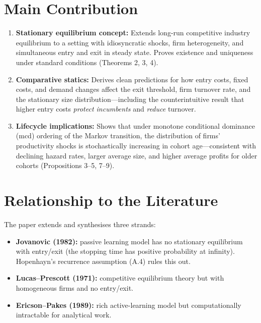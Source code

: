 \section{Main Contribution}

\begin{enumerate}
  \item \textbf{Stationary equilibrium concept:} Extends long-run competitive
    industry equilibrium to a setting with idiosyncratic shocks, firm
    heterogeneity, and simultaneous entry and exit in steady state. Proves
    existence and uniqueness under standard conditions (Theorems 2, 3, 4).

  \item \textbf{Comparative statics:} Derives clean predictions for how entry
    costs, fixed costs, and demand changes affect the exit threshold, firm
    turnover rate, and the stationary size distribution---including the
    counterintuitive result that higher entry costs \emph{protect incumbents}
    and \emph{reduce} turnover.

  \item \textbf{Lifecycle implications:} Shows that under monotone conditional
    dominance (mcd) ordering of the Markov transition, the distribution of
    firms' productivity shocks is stochastically increasing in cohort
    age---consistent with declining hazard rates, larger average size, and
    higher average profits for older cohorts (Propositions 3--5, 7--9).
\end{enumerate}

\section{Relationship to the Literature}

The paper extends and synthesises three strands:
\begin{itemize}
  \item \textbf{Jovanovic (1982):} passive learning model has no stationary
    equilibrium with entry/exit (the stopping time has positive probability at
    infinity). Hopenhayn's recurrence assumption (A.4) rules this out.
  \item \textbf{Lucas--Prescott (1971):} competitive equilibrium theory but
    with homogeneous firms and no entry/exit.
  \item \textbf{Ericson--Pakes (1989):} rich active-learning model but
    computationally intractable for analytical work.
\end{itemize}

